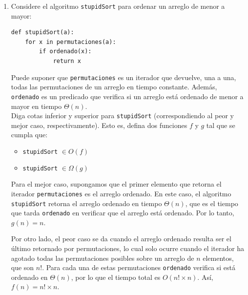 \documentclass[letterpaper, 12pt]{article}
\begin{document}
\begin{enumerate}


\item Considere el algoritmo \texttt{stupidSort} para ordenar un arreglo de menor a
mayor: \\

\begin{verbatim}
def stupidSort(a):
    for x in permutaciones(a):
        if ordenado(x):
            return x
\end{verbatim}

Puede suponer que \texttt{permutaciones} es un iterador que devuelve, una a una, todas las permutaciones de un arreglo en tiempo constante. Además, \texttt{ordenado} es un predicado que verifica si un arreglo está ordenado de menor a mayor en tiempo $\Theta(n)$. \\

Diga cotas inferior y superior para \texttt{stupidSort} (correspondiendo al peor y mejor caso, respectivamente). Esto es, defina dos funciones $f$ y $g$ tal que se cumpla que: \\

\begin{multicols}{2}
    \begin{itemize}
        \item \texttt{stupidSort} $\in O(f)$
        \item \texttt{stupidSort} $\in \Omega(g)$
    \end{itemize}
\end{multicols}

Para el mejor caso, supongamos que el primer elemento que retorna el iterador \texttt{permutaciones} es el arreglo ordenado. En este caso, el algoritmo \texttt{stupidSort} retorna el arreglo ordenado en tiempo $\Theta(n)$, que es el tiempo que tarda \texttt{ordenado} en verificar que el arreglo está ordenado. Por lo tanto, $g(n) = n$.

Por otro lado, el peor caso se da cuando el arreglo ordenado resulta ser el último retornado por {permutaciones}, lo cual solo ocurre cuando el iterador ha agotado todas las permutaciones posibles sobre un arreglo de $n$ elementos, que son $n!$. Para cada una de estas permutaciones \texttt{ordenado} verifica si está ordenado en $\Theta(n)$, por lo que el tiempo total es $O(n! \times n)$. Así, $f(n) = n! \times n$. \\



\end{enumerate}
\end{document}
